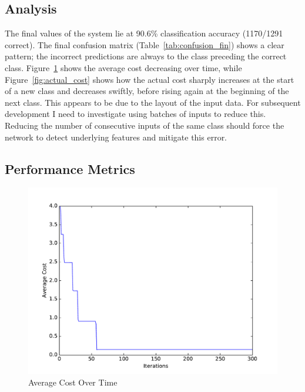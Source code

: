  

\subsection{Analysis}\label{sec:analysis}

The final values of the system lie at 90.6\% classification accuracy (1170/1291 correct). The final confusion matrix (Table~\ref{tab:confusion_fin}) shows a clear pattern; the incorrect predictions are always to the class preceding the correct class. Figure~\ref{fig:avg_cost} shows the average cost decreasing over time, while Figure~\ref{fig:actual_cost} shows how the actual cost sharply increases at the start of a new class and decreases swiftly, before rising again at the beginning of the next class. This appears to be due to the layout of the input data. For subsequent development I need to investigate using batches of inputs to reduce this. Reducing the number of consecutive inputs of the same class should force the network to detect underlying features and mitigate this error.

\subsection{Performance Metrics}




\begin{figure}
	\centering
	\includegraphics[width=\textwidth]{figures/multilayer_perceptron_average_cost}
	\caption{Average Cost Over Time}
	\label{fig:avg_cost}
	\centering
\end{figure}

